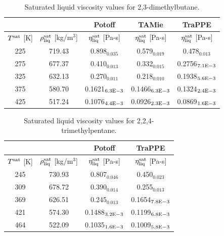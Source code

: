\documentclass[preprint,review,12pt]{elsarticle}
\begin{document}
	\begin{table}[H]
		\caption{Saturated liquid viscosity values for 2,3-dimethylbutane.}
		\begin{center}
			\begin{tabular}{|c|c|c|c|c|}
				\hline
				&                                       & Potoff            & TAMie             & TraPPE            \\ \hline
				$T^{\rm sat}$ {[}K{]} & $\rho^{\rm sat}_{\rm liq}$ [kg/m$^3$] & $\eta_{\rm liq}^{\rm sat}$ {[}Pa-s{]} & $\eta_{\rm liq}^{\rm sat}$ {[}Pa-s{]} & $\eta_{\rm liq}^{\rm sat}$ {[}Pa-s{]} \\ \hline
				225 & 719.43 & 0.898$_{0.035}$   & 0.579$_{0.019}$   & 0.478$_{0.013}$   \\ \hline
				275 & 677.37 & 0.410$_{0.013}$   & 0.332$_{0.015}$   & 0.2756$_{7.1 \rm E-3}$ \\ \hline
				325 & 632.13 & 0.270$_{0.011}$   & 0.218$_{0.010}$   & 0.1938$_{5.6 \rm E-3}$ \\ \hline
				375 & 580.70 & 0.1621$_{6.3 \rm E-3}$ & 0.1466$_{6.3 \rm E-3}$ & 0.1324$_{2.4 \rm E-3}$ \\ \hline
				425 & 517.24 & 0.1076$_{4.4 \rm E-3}$ & 0.0926$_{2.3 \rm E-3}$ & 0.0869$_{1.6 \rm E-3}$ \\ \hline
			\end{tabular}
		\end{center}
	\end{table}
	
	\begin{table}[H]
		\caption{Saturated liquid viscosity values for 2,2,4-trimethylpentane.}
		\begin{center}
			\begin{tabular}{|c|c|c|c|}
				\hline
				&                                       & Potoff            & TraPPE            \\ \hline
				$T^{\rm sat}$ {[}K{]} & $\rho^{\rm sat}_{\rm liq}$ [kg/m$^3$] & $\eta_{\rm liq}^{\rm sat}$ {[}Pa-s{]} & $\eta_{\rm liq}^{\rm sat}$ {[}Pa-s{]} \\ \hline
				245 & 730.93 & 0.807$_{0.046}$   & 0.450$_{0.023}$   \\ \hline
				309 & 678.72 & 0.390$_{0.014}$   & 0.255$_{0.013}$   \\ \hline
				369 & 626.51 & 0.245$_{0.013}$   & 0.1654$_{7.8 \rm E-3}$ \\ \hline
				421 & 574.30 & 0.1488$_{3.2 \rm E-3}$ & 0.1199$_{6.8 \rm E-3}$ \\ \hline
				464 & 522.09 & 0.1035$_{1.6 \rm E-3}$ & 0.1009$_{5.8 \rm E-3}$ \\ \hline
			\end{tabular}
		\end{center}
	\end{table}
\end{document}
